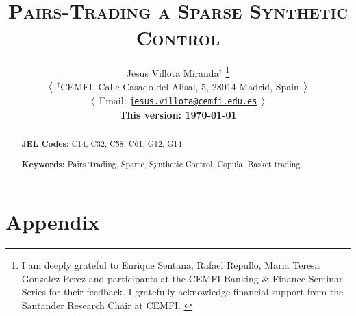 \documentclass[12pt,a4paper]{article}
\title{
\textsc{
\Large 
Pairs-Trading a Sparse Synthetic Control 
}
}
\author[1]{
{  
{
\large 
Jesus Villota Miranda}$^{\dagger}$
\footnote{
\scriptsize{
I am deeply grateful to Enrique Sentana, Rafael Repullo, Maria Teresa Gonzalez-Perez and participants at the CEMFI Banking \& Finance Seminar Series for their feedback.
I gratefully acknowledge financial support from the Santander Research Chair at CEMFI.
}
}
}

\bx 
{\small
$\big{<}$
\noindent $^{\dagger}$CEMFI, Calle Casado del Alisal, 5, 28014 Madrid, Spain 
$\big{>}$

$\big{<}$
Email: \href{mailto:jesus.villota@cemfi.edu.es}{\texttt{jesus.villota@cemfi.edu.es}}
$\big{>}$

\small \textbf{This version: \mydate\today}
}
}
\date{}
\begin{document}
\maketitle
\thispagestyle{empty}
\begin{abstract}
 

\bx 
\noindent\textbf{JEL Codes:} C14, C32, C58, C61, G12, G14

\mx 
\noindent\textbf{Keywords:} Pairs Trading, Sparse, Synthetic Control, Copula, Basket trading
\end{abstract}

\newpage
\setcounter{page}{1}
















\newpage
\processdelayedfloats 
\renewcommand{\thefigure}{A\arabic{figure}} 
\renewcommand{\thetable}{A\arabic{table}}

\appendix
\newpage
\section{Appendix}

\end{document}
